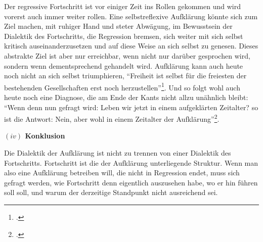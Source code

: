 \documentclass[a4paper, 12pt]{article}
\begin{document}
\begin{onehalfspace}
Der regressive Fortschritt ist vor einiger Zeit ins Rollen gekommen und wird vorerst auch immer weiter rollen. Eine selbstreflexive Aufklärung könnte sich zum Ziel machen, mit ruhiger Hand und steter Abwägung, im Bewusstsein der Dialektik des Fortschritts, die Regression bremsen, sich weiter mit sich selbst kritisch auseinanderzusetzen und auf diese Weise an sich selbst zu genesen. Dieses abstrakte Ziel ist aber nur erreichbar, wenn nicht nur darüber gesprochen wird, sondern wenn dementsprechend gehandelt wird. Aufklärung kann auch heute noch nicht an sich selbst triumphieren, "`Freiheit ist selbst für die freiesten der bestehenden Gesellschaften erst noch herzustellen"'\footnote{\Cite[Siehe][S. 98]{marcuse}.}. Und so folgt wohl auch heute noch eine Diagnose, die am Ende der Kants nicht allzu unähnlich bleibt: "`Wenn denn nun gefragt wird: Leben wir jetzt in einem aufgeklärten Zeitalter? so ist die Antwort: Nein, aber wohl in einem Zeitalter der Aufklärung"'\footnote{\Cite[Siehe][S. 491]{kant}.}.

\vspace{5mm}

\noindent\textbf{$(iv)$ Konklusion}

\noindent 
Die Dialektik der Aufklärung ist nicht zu trennen von einer Dialektik des Fortschritts. Fortschritt ist die der Aufklärung unterliegende Struktur. Wenn man also eine Aufklärung betreiben will, die nicht in Regression endet, muss sich gefragt werden, wie Fortschritt denn eigentlich auszusehen habe, wo er hin führen soll soll, und warum der derzeitige Standpunkt nicht ausreichend sei.



\end{onehalfspace}
\end{document}
